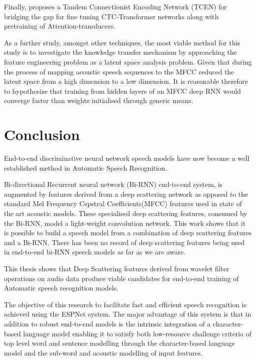 Finally, \cite{wang2019bridging} proposes a Tandem Connectionist Encoding Network (TCEN) for bridging the gap for fine tuning CTC-Transformer networks along with pretraining of Attention-transducers.

As a further study, amongst other techniques, the most viable method for this study is to investigate the knowledge transfer mechanism by approaching the feature engineering problem as a latent space analysis problem.  Given that during the process of mapping acoustic speech sequences to the MFCC reduced the latent space from a high dimension to a low dimension.  It is reasonable therefore to hypothesize that training from hidden layers of an MFCC deep RNN would converge faster than weights initialised through generic means.

\section{Conclusion}
End-to-end discriminative neural network speech models have now become a well established method in Automatic Speech Recognition. 

Bi-directional Recurrent neural network (Bi-RNN) end-to-end system, is augmented by features derived from a deep scattering network as opposed to the standard Mel Frequency Cepstral Coefficients(MFCC) features used in state of the art acoustic models.  These specialised deep scattering features, consumed by the Bi-RNN, model a light-weight convolution network. This work shows that it is possible to build a speech model from a combination of deep scattering features and a Bi-RNN. There has been no record of deep scattering features being used in end-to-end bi-RNN speech models as far as we are aware.  

This thesis shows that Deep Scattering features derived from wavelet filter operations on audio data produce viable candidates for end-to-end training of Automatic speech recognition models.

The objective of this research to facilitate fast and efficient speech recognition is achieved using the ESPNet system.  The major advantage of this system is that in addition to robust end-to-end models is the intrinsic integration of a character-based language model enabling it to satisfy both low-resource challenge criteria of top level word and sentence modelling through the character-based language model and the sub-word and acoustic modelling of input features.
